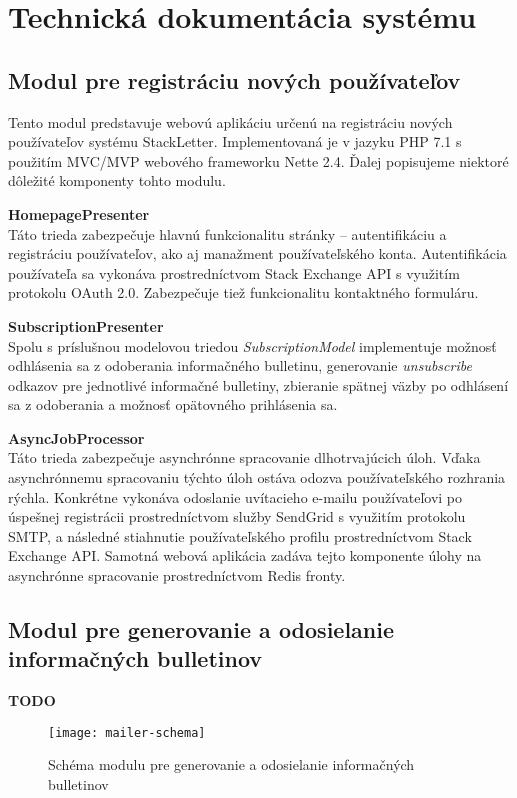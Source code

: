 \chapter{Technická dokumentácia systému}\label{tech-doc}

\section{Modul pre registráciu nových používateľov}

Tento modul predstavuje webovú aplikáciu určenú na registráciu nových používateľov systému StackLetter. Implementovaná je
v jazyku PHP 7.1 s použitím MVC/MVP webového frameworku Nette 2.4. Ďalej popisujeme niektoré dôležité komponenty tohto modulu.

\textbf{HomepagePresenter}\\
Táto trieda zabezpečuje hlavnú funkcionalitu stránky -- autentifikáciu a registráciu používateľov, ako aj manažment
používateľského konta. Autentifikácia používateľa sa vykonáva prostredníctvom Stack Exchange API s využitím protokolu OAuth 2.0.
Zabezpečuje tiež funkcionalitu kontaktného formuláru.

\textbf{SubscriptionPresenter}\\
Spolu s príslušnou modelovou triedou \textit{SubscriptionModel} implementuje možnosť odhlásenia sa z odoberania
informačného bulletinu, generovanie \textit{unsubscribe} odkazov pre jednotlivé informačné bulletiny, zbieranie spätnej
väzby po odhlásení sa z odoberania a možnosť opätovného prihlásenia sa.

\textbf{AsyncJobProcessor}\\
Táto trieda zabezpečuje asynchrónne spracovanie dlhotrvajúcich úloh. Vďaka asynchrónnemu spracovaniu týchto úloh ostáva
odozva používateľského rozhrania rýchla. Konkrétne vykonáva odoslanie uvítacieho e-mailu používateľovi po úspešnej
registrácii prostredníctvom služby SendGrid s využitím protokolu SMTP, a následné stiahnutie používateľského profilu
prostredníctvom Stack Exchange API.
Samotná webová aplikácia zadáva tejto komponente úlohy na asynchrónne spracovanie prostredníctvom Redis fronty.


\section{Modul pre generovanie a odosielanie informačných bulletinov}

\textbf{TODO}

\begin{figure}[H]\begin{center}
\texttt{[image: mailer-schema]}
\caption{Schéma modulu pre generovanie a odosielanie informačných bulletinov \label{fig:mailer-schema}}\end{center}
\end{figure}

